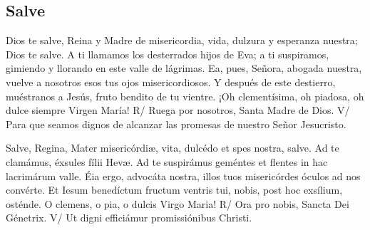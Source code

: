 \documentclass[./devocionario.tex]{subfiles}
\begin{document}
\subsection*{Salve}
\begin{multicols}{2}
    Dios te salve, Reina y Madre de mi­se­ri­cordia, vida, dulzura y esperanza nuestra; Dios te salve. 
    A ti llamamos los desterrados hijos de Eva; a ti suspiramos, gimiendo y llorando en este valle de lágrimas. 
    Ea, pues, Señora, abogada nuestra, vuelve a nosotros esos tus ojos mi­se­ri­cordiosos. Y después de este destierro, muéstranos a Jesús, 
    fruto bendito de tu vientre. ¡Oh cle­men­tísima, oh piadosa, oh dulce siempre Virgen María!\newline
    R/ Ruega por nosotros, Santa Madre de Dios.\newline
    V/ Para que seamos dignos de alcanzar las promesas de nuestro Señor Jesucristo.

    \columnbreak
    
    Salve, Regina, Mater mi­se­ri­córdiæ, vita, dulcédo et spes nostra, salve. Ad te clamámus, éxsules fílii Hevæ. 
    Ad te suspirámus geméntes et flentes in hac lacrimárum valle. Éia ergo, advocáta nostra, illos tuos mi­se­ri­córdes óculos ad nos convérte. 
    Et Iesum benedíctum fructum ventris tui, nobis, post hoc exsílium, osténde. O clemens, o pia, o dulcis Virgo Maria!\newline
    R/ Ora pro nobis, Sancta Dei Génetrix.\newline
    V/ Ut digni efficiámur pro­mi­ssiónibus Christi.
\end{multicols}
    
\end{document}
